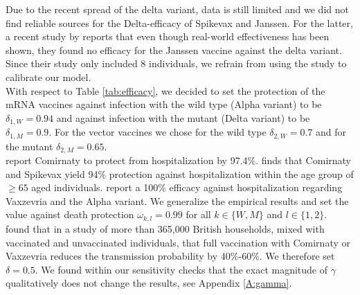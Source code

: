 Due to the recent spread of the delta variant, data is still limited and we did not find reliable sources for the Delta-efficacy of Spikevax and Janssen. For the latter, a recent study by \cite{Jongeneelen.2021} reports that even though real-world effectiveness has been shown, they found no efficacy for the Janssen vaccine against the delta variant. Since their study only included 8 individuals, we refrain from using the study to calibrate our model. \\

With respect to Table \ref{tab:efficacy}, we decided to set the protection of the mRNA vaccines against infection with the wild type (Alpha variant) to be $\delta_{1, W} = 0.94$ and against infection with the mutant (Delta variant) to be $\delta_{1, M} = 0.9$. For the vector vaccines we chose for the wild type $\delta_{2, W} = 0.7$ and for the mutant $\delta_{2, M} = 0.65$.\\

\cite{Abu.2021} report Comirnaty to protect from hospitalization by 97.4\%. \cite{Tenforde.2021} finds that Comirnaty and Spikevax yield 94\% protection against hospitalization within the age group of $\geq 65$ aged individuals. \cite{Voysey.2021} report a 100\% efficacy against hospitalization regarding Vaxzevria and the Alpha variant. We generalize the empirical results and set the value against death protection $\omega_{k,l} = 0.99$ for all $k \in \{W,M\}$ and $l \in \{1,2\}$.\\

\cite{Harris.2021} found that in a study of more than 365,000 British households, mixed with vaccinated and unvaccinated individuals, that full vaccination with Comirnaty or Vaxzevria reduces the transmission probability by 40\%-60\%. We therefore set $\delta = 0.5$. We found within our sensitivity checks that the exact magnitude of $\gamma$ qualitatively does not change the results, see Appendix \ref{A:gamma}. \\


